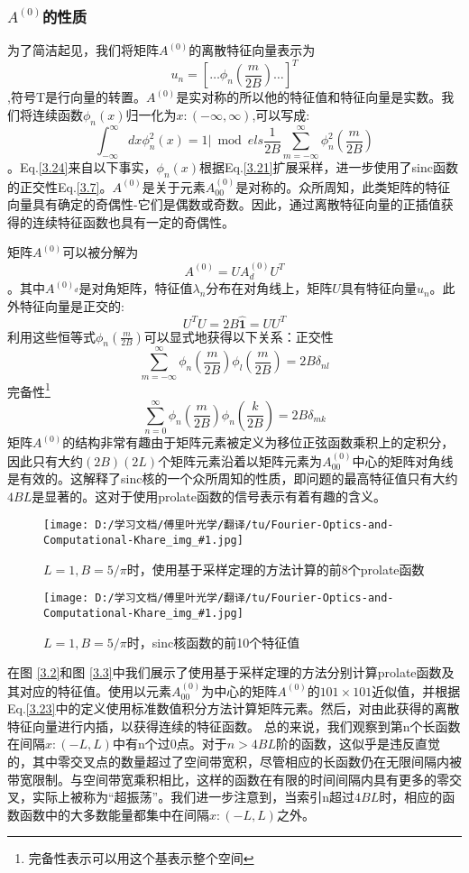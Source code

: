 \documentclass[10pt, UTF8]{ctexart}%
\newcommand {\InsertPic}[3]{\begin{figure}[htbp] \label{#2}\centering \texttt{[image: D:/学习文档/傅里叶光学/翻译/tu/Fourier-Optics-and-Computational-Khare\_img\_\#1.jpg]}\caption{#3} \end{figure}}%
\newcommand{\InsertEqution}[2]{\begin{equation}
  \label{#1}
   #2
 \end{equation}}
\newcommand{\RefEq}[1]{Eq.\ref{#1}}
\newcommand{\InsertInlineEq}[1]{$#1$}
\newcommand{\RefFig}[1]{图 \ref{#1}}
\begin{document}
\begin{sloppypar}
\subsubsection{\InsertInlineEq{A^{(0)}}的性质}
为了简洁起见，我们将矩阵\InsertInlineEq{A^{(0)}}的离散特征向量表示为
\InsertEqution{?1}{u_{n}=\left[\ldots \phi_{n}\left(\frac{m}{2 B}\right) \ldots\right]^{T}},符号T是行向量的转置。\InsertInlineEq{A^{(0)}}是实对称的所以他的特征值和特征向量是实数。我们将连续函数\InsertInlineEq{\phi_n(x)}归一化为\InsertInlineEq{x:(-\infty,\infty)},可以写成:\InsertEqution{3.24}{\int_{-\infty}^{\infty} d x \phi_{n}^{2}(x)=1 | \bmod e l s \frac{1}{2 B} \sum_{m=-\infty}^{\infty} \phi_{n}^{2}\left(\frac{m}{2 B}\right)}。\RefEq{3.24}来自以下事实，\InsertInlineEq{\phi_n(x)}根据\RefEq{3.21}扩展采样，进一步使用了sinc函数的正交性\RefEq{3.7}。\InsertInlineEq{A^{(0)}}是关于元素\InsertInlineEq{A^{(0)}_{00}}是对称的。众所周知，此类矩阵的特征向量具有确定的奇偶性-它们是偶数或奇数。因此，通过离散特征向量的正插值获得的连续特征函数也具有一定的奇偶性。

矩阵\InsertInlineEq{A^{(0)}}可以被分解为\InsertEqution{3.25}{A^{(0)}=U A_{d}^{(0)} U^{T}}。其中\InsertInlineEq{A^{(0)_d}}是对角矩阵，特征值\InsertInlineEq{\lambda_n}分布在对角线上，矩阵\InsertInlineEq{U}具有特征向量\InsertInlineEq{u_n}。此外特征向量是正交的:\InsertEqution{3.26}{U^{T} U=2 B \hat{\mathbf{1}}=U U^{T}}利用这些恒等式\InsertInlineEq{\phi_n(\frac{m}{2B})}可以显式地获得以下关系：正交性\InsertEqution{3.27}{\sum_{m=-\infty}^{\infty} \phi_{n}\left(\frac{m}{2 B}\right) \phi_{l}\left(\frac{m}{2 B}\right)=2 B \delta_{n l}}完备性\footnote[1]{完备性表示可以用这个基表示整个空间}\InsertEqution{3.28}{\sum_{n=0}^{\infty} \phi_{n}\left(\frac{m}{2 B}\right) \phi_{n}\left(\frac{k}{2 B}\right)=2 B \delta_{m k}}
矩阵\InsertInlineEq{A^{(0)}}的结构非常有趣由于矩阵元素被定义为移位正弦函数乘积上的定积分，因此只有大约\InsertInlineEq{(2B)(2L)}个矩阵元素沿着以矩阵元素为\InsertInlineEq{A^{(0)}_{00}}中心的矩阵对角线是有效的。这解释了sinc核的一个众所周知的性质，即问题的最高特征值只有大约\InsertInlineEq{4BL}是显著的。这对于使用prolate函数的信号表示有着有趣的含义。\InsertPic{14}{F3.2}{\InsertInlineEq{L=1,B=5/\pi}时，使用基于采样定理的方法计算的前8个prolate函数}\InsertPic{15}{F3.3}{\InsertInlineEq{L=1,B=5/\pi}时，sinc核函数的前10个特征值}
在\RefFig{3.2}和\RefFig{3.3}中我们展示了使用基于采样定理的方法分别计算prolate函数及其对应的特征值。使用以元素\InsertInlineEq{A^{(0)}_{00}}为中心的矩阵\InsertInlineEq{A^{(0)}}的\InsertInlineEq{101\times101}近似值，并根据\RefEq{3.23}中的定义使用标准数值积分方法计算矩阵元素。然后，对由此获得的离散特征向量进行内插，以获得连续的特征函数。 总的来说，我们观察到第n个长函数在间隔\InsertInlineEq{x:(-L,L)}中有n个过0点。对于\InsertInlineEq{n>4BL}阶的函数，这似乎是违反直觉的，其中零交叉点的数量超过了空间带宽积，尽管相应的长函数仍在无限间隔内被带宽限制。与空间带宽乘积相比，这样的函数在有限的时间间隔内具有更多的零交叉，实际上被称为“超振荡”。我们进一步注意到，当索引n超过\InsertInlineEq{4BL}时，相应的函数函数中的大多数能量都集中在间隔\InsertInlineEq{x:(-L,L)}之外。


\end{sloppypar}
\end{document}
